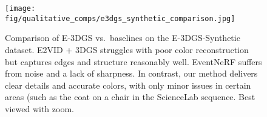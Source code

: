\begin{figure}[t]
\centering
\texttt{[image: fig/qualitative\_comps/e3dgs\_synthetic\_comparison.jpg]}
\caption{Comparison of E-3DGS vs.~baselines on the E-3DGS-Synthetic dataset. E2VID + 3DGS struggles with poor color reconstruction but captures edges and structure reasonably well. EventNeRF suffers from noise and a lack of sharpness. In contrast, our method delivers clear details and accurate colors, with only minor issues in certain areas (such as the coat on a chair in the ScienceLab sequence. Best viewed with zoom.}
\label{fig:synthetic_e3dgs}
\end{figure}
